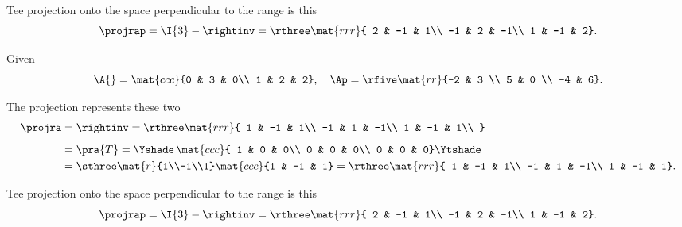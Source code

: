 Tee projection onto the space perpendicular to the range is this
\begin{equation}
  \projrap = \I{3} - \rightinv = \rthree
    \mat{rrr}
    { 2 & -1 &  1\\
     -1 &  2 & -1\\
      1 & -1 &  2}.
\end{equation}

Given 
\begin{equation}
  \A{} = 
  \mat{ccc}
  {0 & 3 & 0\\
   1 & 2 & 2}
   , \quad \Ap = \rfive
   \mat{rr}
   {-2 & 3 \\ 5 & 0 \\ -4 & 6}.
\end{equation}

The projection represents these two 
\begin{equation}
  \begin{split}
    \projra &= \rightinv = \rthree
    \mat{rrr}
    { 
    1 & -1 &  1\\
   -1 &  1 & -1\\
    1 & -1 &  1\\
    }\\[5pt]
    & = \pra{T} =
    \Yshade\,
    \mat{ccc}{
    1 & 0 & 0\\
    0 & 0 & 0\\
    0 & 0 & 0}
    \Ytshade\\
    & =\sthree
    \mat{r}
    {1\\-1\\1}
    \mat{ccc}
    {1 & -1 & 1}
    = \rthree\mat{rrr}
    { 1 & -1 &  1\\
     -1 &  1 & -1\\
      1 & -1 &  1}.
  \end{split}
\end{equation}

Tee projection onto the space perpendicular to the range is this
\begin{equation}
  \projrap = \I{3} - \rightinv = \rthree
    \mat{rrr}
    { 2 & -1 &  1\\
     -1 &  2 & -1\\
      1 & -1 &  2}.
\end{equation}




	
\endinput